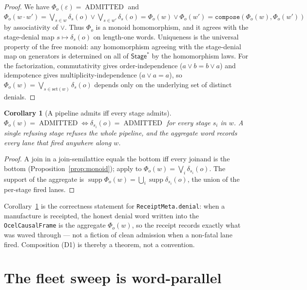 \documentclass[11pt,oneside]{book}
\theoremstyle{definition}
\theoremstyle{plain}
\newtheorem{corollary}[theorem]{Corollary}
\theoremstyle{remark}
\DeclareMathOperator{\supp}{supp}
\newcommand{\code}[1]{\texttt{#1}}
\newcommand{\Adml}{\operatorname{ADMITTED}}          %
\begin{document}
\begin{proof}
We have $\Phi_o(\varepsilon)=\Adml$ and $\Phi_o(w\cdot w')=\bigvee_{s\in w}\delta_s(o)\lor \bigvee_{s\in w'}\delta_s(o)=\Phi_o(w)\lor\Phi_o(w')=\code{compose}(\Phi_o(w),\Phi_o(w'))$ by associativity of $\lor$. %
Thus $\Phi_o$ is a monoid homomorphism, and it agrees with the stage-denial map $s \mapsto \delta_s(o)$ on length-one words. %
Uniqueness is the universal property of the free monoid: any homomorphism agreeing with the stage-denial map on generators is determined on all of $\mathsf{Stage}^{*}$ by the homomorphism laws. %
For the factorization, commutativity gives order-independence ($a\lor b=b\lor a$) and idempotence gives multiplicity-independence ($a\lor a=a$), so $\Phi_o(w)=\bigvee_{s\in\mathrm{set}(w)}\delta_s(o)$ depends only on the underlying set of distinct denials. %
\end{proof}

\begin{corollary}[A pipeline admits iff every stage admits]\label{cor:allstages}
$\Phi_o(w)=\Adml\iff\delta_{s_i}(o)=\Adml$ for every stage $s_i$ in $w$. %
A single refusing stage refuses the whole pipeline, and the aggregate word records \emph{every} lane that fired anywhere along $w$. %
\end{corollary}

\begin{proof}
A join in a join-semilattice equals the bottom iff every joinand is the bottom (Proposition~\ref{prop:monoid}); apply to $\Phi_o(w)=\bigvee_i\delta_{s_i}(o)$. %
The support of the aggregate is $\supp\Phi_o(w)=\bigcup_i\supp\delta_{s_i}(o)$, the union of the per-stage fired lanes. %
\end{proof}

Corollary~\ref{cor:allstages} is the correctness statement for \code{ReceiptMeta.denial}: when a manufacture is receipted, the honest denial word written into the \code{OcelCausalFrame} is the aggregate $\Phi_o(w)$, so the receipt records exactly what was waved through --- not a fiction of clean admission when a non-fatal lane fired. %
Composition (D1) is thereby a theorem, not a convention. %

\section{The fleet sweep is word-parallel}
\end{document}
